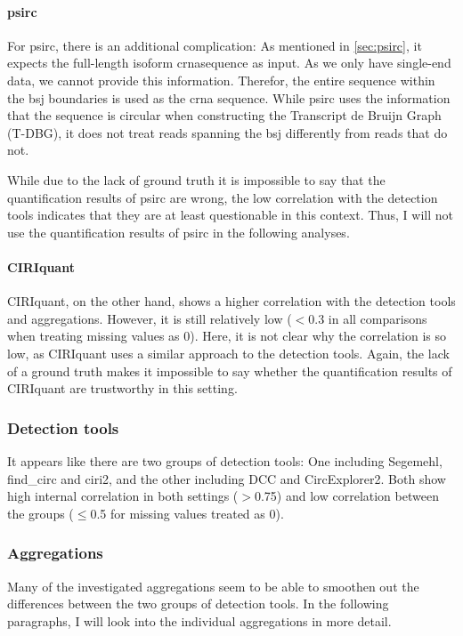 \paragraph{psirc}
For psirc, there is an additional complication: As mentioned in
\cref{sec:psirc}, it expects the full-length isoform \gls{crna}sequence as
input.
As we only have single-end data, we cannot provide this information.
Therefor, the entire sequence within the \gls{bsj} boundaries is used as the
\gls{crna} sequence.
While psirc uses the information that the sequence is circular when
constructing the Transcript de Bruijn Graph (T-DBG), it does not treat reads
spanning the \gls{bsj} differently from reads that do
not\supercite{yu_quantifying_2021}.

While due to the lack of ground truth it is impossible to say that the
quantification results of psirc are wrong, the low correlation with the
detection tools indicates that they are at least questionable in this context.
Thus, I will not use the quantification results of psirc in the following
analyses.

\paragraph{CIRIquant}
CIRIquant, on the other hand, shows a higher correlation with the detection
tools and aggregations.
However, it is still relatively low ($<$0.3 in all comparisons when treating
missing values as 0).
Here, it is not clear why the correlation is so low, as CIRIquant uses a
similar approach to the detection tools.
Again, the lack of a ground truth makes it impossible to say whether the
quantification results of CIRIquant are trustworthy in this setting.

\subsubsection{Detection tools}
It appears like there are two groups of detection tools: One including
Segemehl, find\_circ and ciri2, and the other including DCC and CircExplorer2.
Both show high internal correlation in both settings ($>$0.75) and low
correlation between the groups ($\leq$0.5 for missing values treated as 0).


\subsubsection{Aggregations}
Many of the investigated aggregations seem to be able to smoothen out the
differences between the two groups of detection tools.
In the following paragraphs, I will look into the individual aggregations in
more detail.

